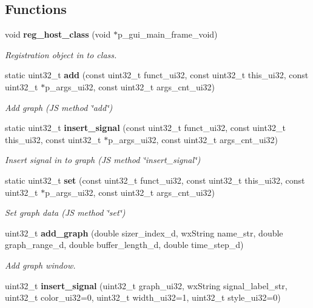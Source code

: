 \subsection*{Functions}
\begin{DoxyCompactItemize}
\item 
void \textbf{ reg\+\_\+host\+\_\+class} (void $\ast$p\+\_\+gui\+\_\+main\+\_\+frame\+\_\+void)
\begin{DoxyCompactList}\small\item\em Registration object in to class. \end{DoxyCompactList}\item 
static uint32\+\_\+t \textbf{ add} (const uint32\+\_\+t funct\+\_\+ui32, const uint32\+\_\+t this\+\_\+ui32, const uint32\+\_\+t $\ast$p\+\_\+args\+\_\+ui32, const uint32\+\_\+t args\+\_\+cnt\+\_\+ui32)
\begin{DoxyCompactList}\small\item\em Add graph (JS method \char`\"{}add\char`\"{}) \end{DoxyCompactList}\item 
static uint32\+\_\+t \textbf{ insert\+\_\+signal} (const uint32\+\_\+t funct\+\_\+ui32, const uint32\+\_\+t this\+\_\+ui32, const uint32\+\_\+t $\ast$p\+\_\+args\+\_\+ui32, const uint32\+\_\+t args\+\_\+cnt\+\_\+ui32)
\begin{DoxyCompactList}\small\item\em Insert signal in to graph (JS method \char`\"{}insert\+\_\+signal\char`\"{}) \end{DoxyCompactList}\item 
static uint32\+\_\+t \textbf{ set} (const uint32\+\_\+t funct\+\_\+ui32, const uint32\+\_\+t this\+\_\+ui32, const uint32\+\_\+t $\ast$p\+\_\+args\+\_\+ui32, const uint32\+\_\+t args\+\_\+cnt\+\_\+ui32)
\begin{DoxyCompactList}\small\item\em Set graph data (JS method \char`\"{}set\char`\"{}) \end{DoxyCompactList}\item 
uint32\+\_\+t \textbf{ add\+\_\+graph} (double sizer\+\_\+index\+\_\+d, wx\+String name\+\_\+str, double graph\+\_\+range\+\_\+d, double buffer\+\_\+length\+\_\+d, double time\+\_\+step\+\_\+d)
\begin{DoxyCompactList}\small\item\em Add graph window. \end{DoxyCompactList}\item 
uint32\+\_\+t \textbf{ insert\+\_\+signal} (uint32\+\_\+t graph\+\_\+ui32, wx\+String signal\+\_\+label\+\_\+str, uint32\+\_\+t color\+\_\+ui32=0, uint32\+\_\+t width\+\_\+ui32=1, uint32\+\_\+t style\+\_\+ui32=0)

\end{DoxyCompactItemize}
